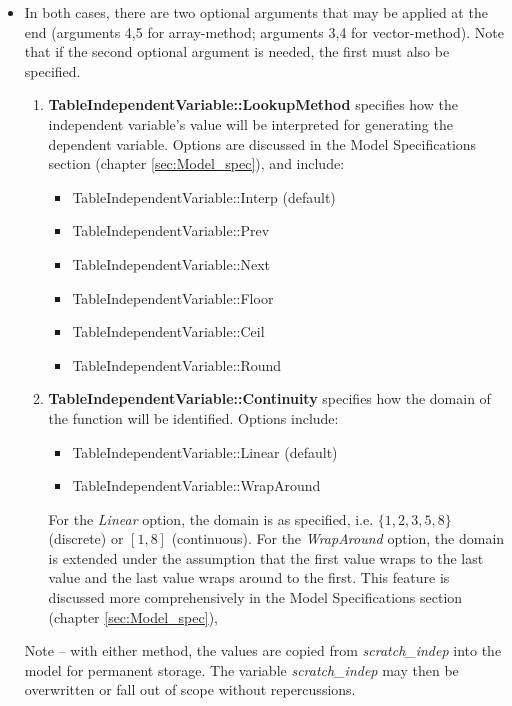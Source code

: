 \documentclass[11pt,fleqn]{report}
\begin{document}
\begin{itemize}
\item In both cases, there are two optional arguments that may be applied
 at the
 end (arguments 4,5 for array-method; arguments 3,4 for vector-method).
 Note that if the second optional argument is needed, the first must also
 be specified.
\begin{enumerate}
 \item \textbf{TableIndependentVariable::LookupMethod}
 specifies how the independent
 variable's value will be interpreted for generating the dependent variable.
 Options are discussed in the Model Specifications section (chapter
 \ref{sec:Model_spec}), and include:
  \begin{itemize}
   \item TableIndependentVariable::Interp (default)
   \item TableIndependentVariable::Prev
   \item TableIndependentVariable::Next
   \item TableIndependentVariable::Floor
   \item TableIndependentVariable::Ceil
   \item TableIndependentVariable::Round
  \end{itemize}
 \item \textbf{TableIndependentVariable::Continuity}
 specifies how the domain of the function will be identified.
 Options include:
  \begin{itemize}
   \item TableIndependentVariable::Linear (default)
   \item TableIndependentVariable::WrapAround
  \end{itemize}

 For the \textit{Linear} option, the domain is
 as specified, i.e.  $\{1,2,3,5,8\}$ (discrete) or $[1,8]$ (continuous).
  For the \textit{WrapAround} option,
 the domain is extended under the assumption that the first value wraps to
 the last value and the last value wraps around to the first.  This feature is
 discussed more comprehensively in the Model Specifications section (chapter
 \ref{sec:Model_spec}),
\end{enumerate}

Note -- with either method, the values are copied from \textit{scratch\_indep}
 into the model for permanent storage.
The variable \textit{scratch\_indep} may then be overwritten or fall out of
 scope without repercussions.
\end{itemize}
\end{document}
